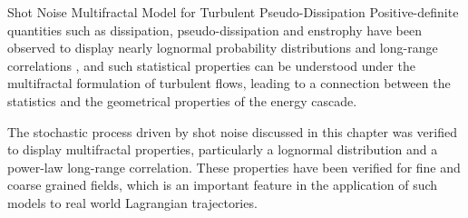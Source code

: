 \begin{chapter}{Shot Noise Multifractal Model for Turbulent Pseudo-Dissipation}
Positive-definite quantities such as dissipation, pseudo-dissipation and enstrophy have been observed to display nearly lognormal probability distributions and long-range correlations \parencite{yeungpope1989}, and such statistical properties can be understood under the multifractal formulation of turbulent flows, leading to a connection between the statistics and the geometrical properties of the energy cascade.

The stochastic process driven by shot noise discussed in this chapter was verified to display multifractal properties, particularly a lognormal distribution and a power-law long-range correlation. These properties have been verified for fine and coarse grained fields, which is an important feature in the application of such models to real world Lagrangian trajectories.


\end{chapter}